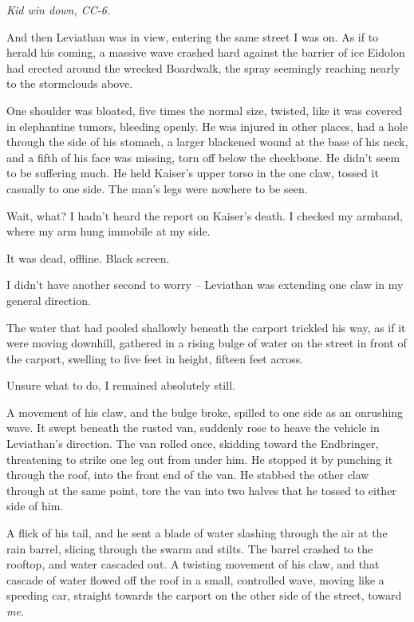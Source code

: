 \emph{Kid win down, CC-6.}



And then Leviathan was in view, entering the same street I was on.  As if to herald his coming, a massive wave crashed hard against the barrier of ice Eidolon had erected around the wrecked Boardwalk, the spray seemingly reaching nearly to the stormclouds above.



One shoulder was bloated, five times the normal size, twisted, like it was covered in elephantine tumors, bleeding openly.  He was injured in other places, had a hole through the side of his stomach, a larger blackened wound at the base of his neck, and a fifth of his face was missing, torn off below the cheekbone.  He didn't seem to be suffering much.  He held Kaiser's upper torso in the one claw, tossed it casually to one side.  The man's legs were nowhere to be seen.



Wait, what?  I hadn't heard the report on Kaiser's death.  I checked my armband, where my arm hung immobile at my side.



It was dead, offline.  Black screen.



I didn't have another second to worry – Leviathan was extending one claw in my general direction.



The water that had pooled shallowly beneath the carport trickled his way, as if it were moving downhill, gathered in a rising bulge of water on the street in front of the carport, swelling to five feet in height, fifteen feet across.



Unsure what to do, I remained absolutely still.



A movement of his claw, and the bulge broke, spilled to one side as an onrushing wave.  It swept beneath the rusted van, suddenly rose to heave the vehicle in Leviathan's direction.  The van rolled once, skidding toward the Endbringer, threatening to strike one leg out from under him.  He stopped it by punching it through the roof, into the front end of the van.  He stabbed the other claw through at the same point, tore the van into two halves that he tossed to either side of him.



A flick of his tail, and he sent a blade of water slashing through the air at the rain barrel, slicing through the swarm and stilts.  The barrel crashed to the rooftop, and water cascaded out.  A twisting movement of his claw, and that cascade of water flowed off the roof in a small, controlled wave, moving like a speeding car, straight towards the carport on the other side of the street, toward \emph{me}.



